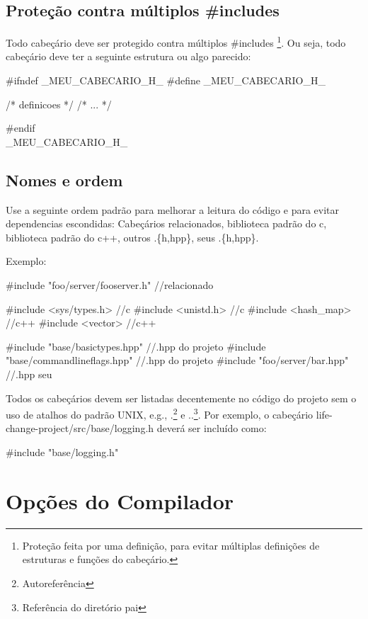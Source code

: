 \documentclass{article}
\begin{document}
\subsection{Proteção contra múltiplos \#includes}

Todo cabeçário deve ser protegido contra  múltiplos \#includes \footnote{Proteção feita por uma definição, para evitar múltiplas definições de estruturas e funções do cabeçário.}. Ou seja, todo cabeçário deve ter a seguinte estrutura ou algo parecido:

\begin{code}
#ifndef _MEU_CABECARIO_H_
#define _MEU_CABECARIO_H_

/*	definicoes	*/
/*	   ...   	*/

#endif \\_MEU_CABECARIO_H_

\end{code}

\subsection{Nomes e ordem}
Use a seguinte ordem padrão para melhorar a leitura do código e para evitar dependencias escondidas: Cabeçários relacionados, biblioteca padrão do c, biblioteca padrão do c++, outros .\{h,hpp\}, seus .\{h,hpp\}.

Exemplo:
\begin{code}
#include "foo/server/fooserver.h" //relacionado

#include <sys/types.h> //c
#include <unistd.h> //c
#include <hash_map> //c++
#include <vector> //c++

#include "base/basictypes.hpp" //.hpp do projeto
#include "base/commandlineflags.hpp" //.hpp do projeto
#include "foo/server/bar.hpp" //.hpp seu
\end{code}

Todos os cabeçários devem ser listadas decentemente no código do projeto sem o uso de atalhos do padrão UNIX, e.g., .\footnote{Autoreferência} e ..\footnote{Referência do diretório pai}. Por exemplo, o cabeçário life-change-project/src/base/logging.h deverá ser incluído como:

\begin{code}
#include "base/logging.h"
\end{code}

\section{Opções do Compilador}
\end{document}
